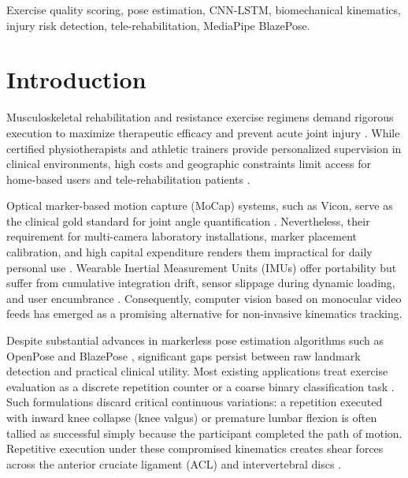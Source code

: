 \documentclass[conference]{IEEEtran}
\begin{document}
\begin{IEEEkeywords}
Exercise quality scoring, pose estimation, CNN-LSTM, biomechanical kinematics, injury risk detection, tele-rehabilitation, MediaPipe BlazePose.
\end{IEEEkeywords}

\section{Introduction}

Musculoskeletal rehabilitation and resistance exercise regimens demand rigorous execution to maximize therapeutic efficacy and prevent acute joint injury \cite{hewett2005biomechanical}. While certified physiotherapists and athletic trainers provide personalized supervision in clinical environments, high costs and geographic constraints limit access for home-based users and tele-rehabilitation patients \cite{woo2024exercise}. 

Optical marker-based motion capture (MoCap) systems, such as Vicon, serve as the clinical gold standard for joint angle quantification \cite{vanderkruk2018present}. Nevertheless, their requirement for multi-camera laboratory installations, marker placement calibration, and high capital expenditure renders them impractical for daily personal use \cite{kuster2020validity}. Wearable Inertial Measurement Units (IMUs) offer portability but suffer from cumulative integration drift, sensor slippage during dynamic loading, and user encumbrance \cite{choi2022realtime}. Consequently, computer vision based on monocular video feeds has emerged as a promising alternative for non-invasive kinematics tracking.

Despite substantial advances in markerless pose estimation algorithms such as OpenPose \cite{cao2021openpose} and BlazePose \cite{bazarevsky2020blazepose}, significant gaps persist between raw landmark detection and practical clinical utility. Most existing applications treat exercise evaluation as a discrete repetition counter or a coarse binary classification task \cite{liao2020deep}. Such formulations discard critical continuous variations: a repetition executed with inward knee collapse (knee valgus) or premature lumbar flexion is often tallied as successful simply because the participant completed the path of motion. Repetitive execution under these compromised kinematics creates shear forces across the anterior cruciate ligament (ACL) and intervertebral discs \cite{mcgill2007low, hewett2005biomechanical}.
\end{document}
